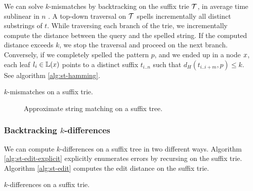We can solve $k$-mismatches by backtracking \citep{Ukkonen1993, Baeza1999} on the suffix trie $\mathcal {T}$, in average time sublinear in $n$ \citep{Navarro2000}.
A top-down traversal on $\mathcal {T}$ spells incrementally all distinct substrings of $t$.
While traversing each branch of the trie, we incrementally compute the distance between the query and the spelled string.
If the computed distance exceeds $k$, we stop the traversal and proceed on the next branch.
Conversely, if we completely spelled the pattern $p$, and we ended up in a node $x$, each leaf $l_i \in \mathbb {L}(x)$ points to a distinct suffix $t_{i..n}$ such that $d_H(t_{i..i+m}, p) \leq k$.
See algorithm \ref{alg:st-hamming}.

\begin{algorithm}[h]
\caption{$k$-mismatches on a suffix trie.}
\label{alg:st-hamming}
\begin{algorithmic}[1]
		\State {}
	\Else 
		\ForAll {$\Cn \in \Ci(\Tn)$}
				\State {}
			\Else
				\State {}
			\EndIf
		\EndFor
	\EndIf
\EndProcedure
\end{algorithmic}
\end{algorithm}

\begin{figure}[h]
\begin{center}
\caption{Approximate string matching on a suffix tree.}
\label{fig:st-hamming}

\end{center}
\end{figure}

\subsubsection{Backtracking $k$-differences}

We can compute $k$-differences on a suffix tree in two different ways. Algorithm \ref{alg:st-edit-explicit} explicitly enumerates errors by recursing on the suffix trie. Algorithm \ref{alg:st-edit} computes the edit distance on the suffix trie.

\begin{algorithm}[h]
\caption{$k$-differences on a suffix trie.}
\label{alg:st-edit-explicit}
\begin{algorithmic}[1]
		\State {}
	\Else 
		\State {}
		\ForAll {$\Cn \in \Ci(\Tn)$}
			\State {}
				\State {}
			\Else
				\State {}
			\EndIf
		\EndFor
	\EndIf
\EndProcedure
\end{algorithmic}
\end{algorithm}

